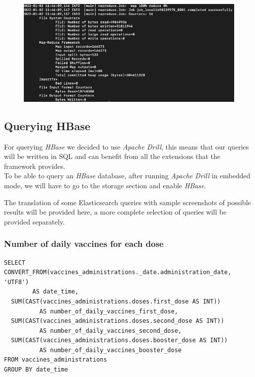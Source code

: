 \documentclass[12pt, a4paper]{article}
\begin{document}
\begin{figure}[ht]
  \centering
  \includegraphics[width=\linewidth]{hbase_import.png}
\end{figure}

\subsection{Querying HBase}

For querying \emph{HBase} we decided to use \emph{Apache Drill}, this means that our
queries will be written in SQL and can benefit from all the extensions that the 
framework provides. \\
To be able to query an \emph{HBase} database, after running \emph{Apache Drill} in 
embedded mode, we will have to go to the storage section and enable \emph{HBase}.  

\noindent
The translation of some Elasticsearch queries with sample screenshots of possible results
will be provided here, a more complete selection of queries will be provided separately.

\subsubsection{Number of daily vaccines for each dose}

\begin{tcolorbox}[fontupper=\scriptsize]
  \begin{verbatim}
SELECT CONVERT_FROM(vaccines_administrations._date.administration_date, 'UTF8') 
        AS date_time,
  SUM(CAST(vaccines_administrations.doses.first_dose AS INT)) 
          AS number_of_daily_vaccines_first_dose,
  SUM(CAST(vaccines_administrations.doses.second_dose AS INT)) 
          AS number_of_daily_vaccines_second_dose,
  SUM(CAST(vaccines_administrations.doses.booster_dose AS INT)) 
          AS number_of_daily_vaccines_booster_dose
FROM vaccines_administrations
GROUP BY date_time
  \end{verbatim}
\end{tcolorbox}
\end{document}
